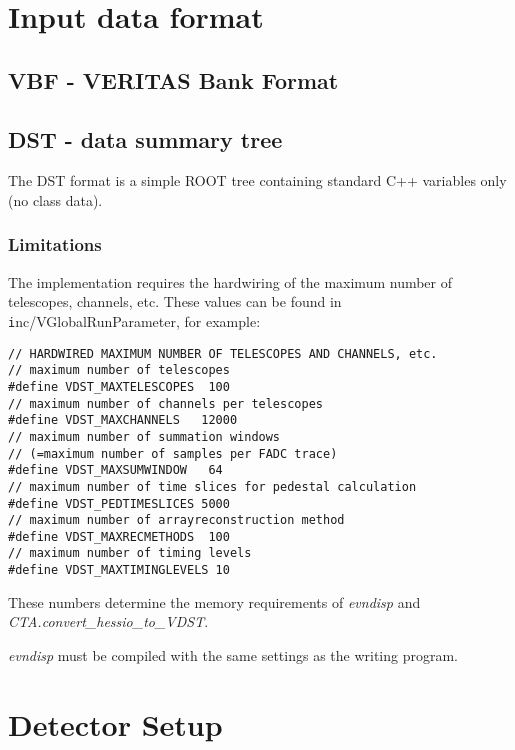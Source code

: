 \documentclass[titlepage,a4paper,twoside,11pt]{report}
\begin{document}
\chapter{Input data format}

\section{VBF - VERITAS Bank Format}

\section{DST - data summary tree}
\label{SECTION.DST}

The DST format is a simple ROOT tree containing standard C++ variables only (no class data).

\subsection{Limitations}
\label{SUBSECTION.DST.LIMITATIONS}

The implementation requires the hardwiring of the maximum number of telescopes, channels, etc. 
These values can be found in {\texttt inc/VGlobalRunParameter}, for example:

\begin{lstlisting}
// HARDWIRED MAXIMUM NUMBER OF TELESCOPES AND CHANNELS, etc.
// maximum number of telescopes
#define VDST_MAXTELESCOPES  100
// maximum number of channels per telescopes
#define VDST_MAXCHANNELS   12000
// maximum number of summation windows
// (=maximum number of samples per FADC trace)   
#define VDST_MAXSUMWINDOW   64
// maximum number of time slices for pedestal calculation
#define VDST_PEDTIMESLICES 5000   
// maximum number of arrayreconstruction method 
#define VDST_MAXRECMETHODS  100
// maximum number of timing levels
#define VDST_MAXTIMINGLEVELS 10    
\end{lstlisting}

 These numbers determine the memory requirements of {\it evndisp} and {\it CTA.convert\_hessio\_to\_VDST}.

 {\it evndisp} must be compiled with the same settings as the writing program.


\chapter{Detector Setup}
\end{document}
